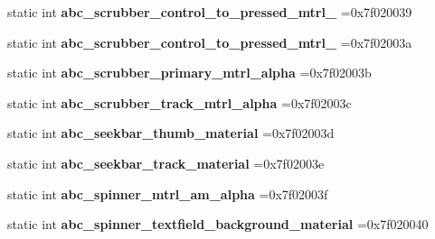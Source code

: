 \begin{DoxyCompactItemize}
static int {\bfseries abc\+\_\+scrubber\+\_\+control\+\_\+to\+\_\+pressed\+\_\+mtrl\+\_} =0x7f020039
\item 
\mbox{\label{classandroid_1_1support_1_1graphics_1_1drawable_1_1R_1_1drawable_aa33f2f072c70e53407911ba65200903b}} 
static int {\bfseries abc\+\_\+scrubber\+\_\+control\+\_\+to\+\_\+pressed\+\_\+mtrl\+\_} =0x7f02003a
\item 
\mbox{\label{classandroid_1_1support_1_1graphics_1_1drawable_1_1R_1_1drawable_a757876c20ea3cbf0700c3e5554fdf667}} 
static int {\bfseries abc\+\_\+scrubber\+\_\+primary\+\_\+mtrl\+\_\+alpha} =0x7f02003b
\item 
\mbox{\label{classandroid_1_1support_1_1graphics_1_1drawable_1_1R_1_1drawable_ac165d167148dee1e919aa060aea75592}} 
static int {\bfseries abc\+\_\+scrubber\+\_\+track\+\_\+mtrl\+\_\+alpha} =0x7f02003c
\item 
\mbox{\label{classandroid_1_1support_1_1graphics_1_1drawable_1_1R_1_1drawable_a546c1cbe1c24556be645d16844658091}} 
static int {\bfseries abc\+\_\+seekbar\+\_\+thumb\+\_\+material} =0x7f02003d
\item 
\mbox{\label{classandroid_1_1support_1_1graphics_1_1drawable_1_1R_1_1drawable_a0a6c7c8e0bbd8f3a7a22606cd84b9230}} 
static int {\bfseries abc\+\_\+seekbar\+\_\+track\+\_\+material} =0x7f02003e
\item 
\mbox{\label{classandroid_1_1support_1_1graphics_1_1drawable_1_1R_1_1drawable_a1adc5be67fbf757ea289962b9f2df282}} 
static int {\bfseries abc\+\_\+spinner\+\_\+mtrl\+\_\+am\+\_\+alpha} =0x7f02003f
\item 
\mbox{\label{classandroid_1_1support_1_1graphics_1_1drawable_1_1R_1_1drawable_ae0d21ad19dfe541e4a598f4b809010e9}} 
static int {\bfseries abc\+\_\+spinner\+\_\+textfield\+\_\+background\+\_\+material} =0x7f020040

\end{DoxyCompactItemize}
